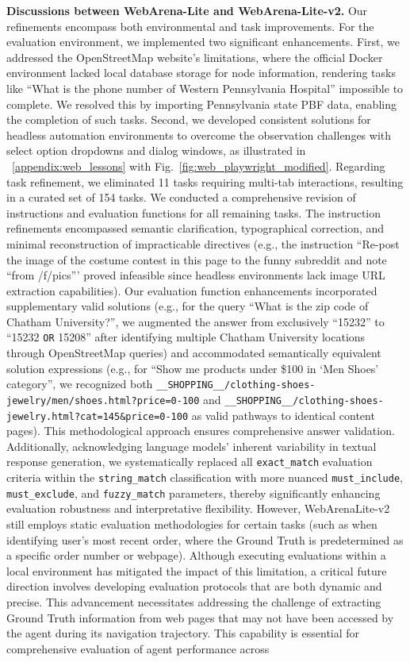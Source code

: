 \textbf{Discussions between WebArena-Lite and WebArena-Lite-v2.}
Our refinements encompass both environmental and task improvements. For the evaluation environment, we implemented two significant enhancements. First, we addressed the OpenStreetMap website's limitations, where the official Docker environment lacked local database storage for node information, rendering tasks like ``What is the phone number of Western Pennsylvania Hospital'' impossible to complete. We resolved this by importing Pennsylvania state PBF data, enabling the completion of such tasks. Second, we developed consistent solutions for headless automation environments to overcome the observation challenges with select option dropdowns and dialog windows, as illustrated in ~\ref{appendix:web_lessons} with Fig.~\ref{fig:web_playwright_modified}. Regarding task refinement, we eliminated 11 tasks requiring multi-tab interactions, resulting in a curated set of 154 tasks. We conducted a comprehensive revision of instructions and evaluation functions for all remaining tasks. The instruction refinements encompassed semantic clarification, typographical correction, and minimal reconstruction of impracticable directives (e.g., the instruction ``Re-post the image of the costume contest in this page to the funny subreddit and note ``from /f/pics''' proved infeasible since headless environments lack image URL extraction capabilities). Our evaluation function enhancements incorporated supplementary valid solutions (e.g., for the query ``What is the zip code of Chatham University?'', we augmented the answer from exclusively ``15232'' to ``15232 \texttt{\textbar OR\textbar} 15208'' after identifying multiple Chatham University locations through OpenStreetMap queries) and accommodated semantically equivalent solution expressions (e.g., for ``Show me products under \$100 in `Men Shoes' category'', we recognized both \texttt{\_\_SHOPPING\_\_/clothing-shoes-jewelry/men/shoes.html?price=0-100} and \texttt{\_\_SHOPPING\_\_/clothing-shoes-jewelry.html?cat=145\&price=0-100} as valid pathways to identical content pages). This methodological approach ensures comprehensive answer validation. Additionally, acknowledging language models' inherent variability in textual response generation, we systematically replaced all \texttt{exact\_match} evaluation criteria within the \texttt{string\_match} classification with more nuanced \texttt{must\_include}, \texttt{must\_exclude}, and \texttt{fuzzy\_match} parameters, thereby significantly enhancing evaluation robustness and interpretative flexibility. However, WebArenaLite-v2 still employs static evaluation methodologies for certain tasks (such as when identifying user's most recent order, where the Ground Truth is predetermined as a specific order number or webpage). Although executing evaluations within a local environment has mitigated the impact of this limitation, a critical future direction involves developing evaluation protocols that are both dynamic and precise. This advancement necessitates addressing the challenge of extracting Ground Truth information from web pages that may not have been accessed by the agent during its navigation trajectory. This capability is essential for comprehensive evaluation of agent performance across 